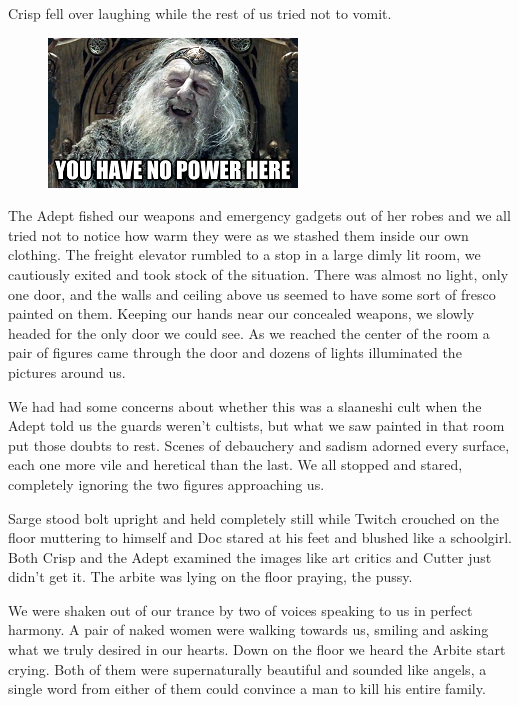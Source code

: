 Crisp fell over laughing while the rest of us tried not to vomit.

\begin{figure}
	\begin{center}
		\includegraphics[width=\figwidth]{pics/6/16.png}
	\end{center}
\end{figure}
The Adept fished our weapons and emergency gadgets out of her robes and we all tried not to notice how warm they were as we stashed them inside our own clothing.
The freight elevator rumbled to a stop in a large dimly lit room, we cautiously exited and took stock of the situation. 
There was almost no light, only one door, and the walls and ceiling above us seemed to have some sort of fresco painted on them. 
Keeping our hands near our concealed weapons, we slowly headed for the only door we could see. 
As we reached the center of the room a pair of figures came through the door and dozens of lights illuminated the pictures around us.

We had had some concerns about whether this was a slaaneshi cult when the Adept told us the guards weren't cultists, but what we saw painted in that room put those doubts to rest. 
Scenes of debauchery and sadism adorned every surface, each one more vile and heretical than the last. 
We all stopped and stared, completely ignoring the two figures approaching us.

Sarge stood bolt upright and held completely still while Twitch crouched on the floor muttering to himself and Doc stared at his feet and blushed like a schoolgirl. 
Both Crisp and the Adept examined the images like art critics and Cutter just didn't get it. 
The arbite was lying on the floor praying, the pussy.

We were shaken out of our trance by two of voices speaking to us in perfect harmony. 
A pair of naked women were walking towards us, smiling and asking what we truly desired in our hearts. 
Down on the floor we heard the Arbite start crying. 
Both of them were supernaturally beautiful and sounded like angels, a single word from either of them could convince a man to kill his entire family.

